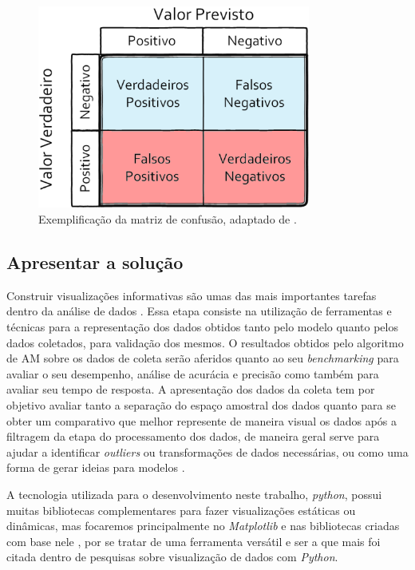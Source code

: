 \begin{figure}[!htb]
	\centering
	\includegraphics[width=0.8\textwidth]{figuras/matriz_consusao.eps}
	\caption{Exemplificação da matriz de confusão, adaptado de .}
	\label{matriz_consusao}
\end{figure}

\subsection{Apresentar a solução}
Construir visualizações informativas são umas das mais importantes tarefas dentro da análise de dados \cite{McKinney2012datapython}. Essa etapa consiste na utilização de ferramentas e técnicas para a representação dos dados obtidos tanto pelo modelo quanto pelos dados coletados, para validação dos mesmos. O resultados obtidos pelo algoritmo de AM sobre os dados de coleta serão aferidos quanto ao seu \textit{benchmarking} \cite{Benchmarking} para avaliar o seu desempenho, análise de acurácia e precisão como também para avaliar seu tempo de resposta. A apresentação dos dados da coleta tem por objetivo avaliar tanto a separação do espaço amostral dos dados quanto para se obter um comparativo que melhor represente de maneira visual os dados após a filtragem da etapa do processamento dos dados, de maneira geral serve para ajudar a identificar \textit{outliers} ou transformações de dados necessárias, ou como uma forma de gerar ideias para modelos \cite{McKinney2012datapython}.

A tecnologia utilizada para o desenvolvimento neste trabalho, \textit{python}, possui muitas bibliotecas complementares para fazer visualizações estáticas ou dinâmicas, mas focaremos principalmente no \textit{Matplotlib} e nas bibliotecas criadas com base nele \cite{McKinney2012datapython}, por se tratar de uma ferramenta versátil e ser a que mais foi citada dentro de pesquisas sobre visualização de dados com \textit{Python}.

